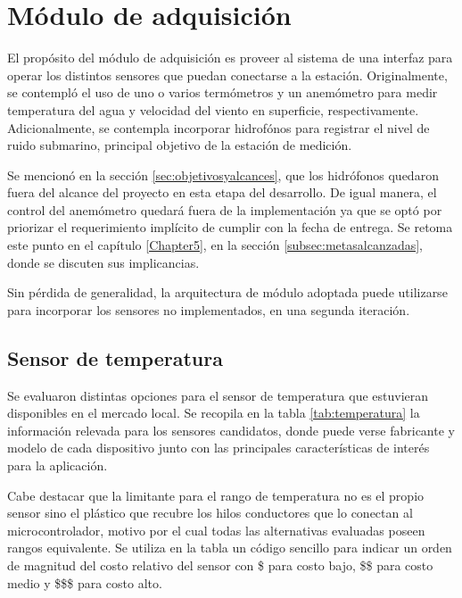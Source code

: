 \clearpage
\section{Módulo de adquisición}
\label{sec:adquisicion}

El propósito del módulo de adquisición es proveer al sistema de una interfaz para operar los distintos sensores que puedan conectarse a la estación.  Originalmente, se contempló el uso de uno o varios termómetros y un anemómetro para medir temperatura del agua y velocidad del viento en superficie, respectivamente. Adicionalmente, se contempla incorporar hidrofónos para registrar el nivel de ruido submarino, principal objetivo de la estación de medición.

Se mencionó en la sección \ref{sec:objetivosyalcances}, que los hidrófonos quedaron fuera del alcance del proyecto en esta etapa del desarrollo.  De igual manera, el control del anemómetro quedará fuera de la implementación ya que se optó por priorizar el requerimiento implícito de cumplir con la fecha de entrega.  Se retoma este punto en el capítulo \ref{Chapter5}, en la sección \ref{subsec:metasalcanzadas}, donde se discuten sus implicancias.

Sin pérdida de generalidad, la arquitectura de módulo adoptada puede utilizarse para incorporar los sensores no implementados, en una segunda iteración.

\subsection{Sensor de temperatura}
\label{subsec:1-wire}


Se evaluaron distintas opciones para el sensor de temperatura que estuvieran disponibles en el mercado local.  Se recopila en la tabla \ref{tab:temperatura} la información relevada para los sensores candidatos, donde puede verse fabricante y modelo de cada dispositivo junto con las principales características de interés para la aplicación.

Cabe destacar que la limitante para el rango de temperatura no es el propio sensor sino el plástico que recubre los hilos conductores que lo conectan al microcontrolador, motivo por el cual todas las alternativas evaluadas poseen rangos equivalente.  Se utiliza en la tabla un código sencillo para indicar un orden de magnitud del costo relativo del sensor con \$ para costo bajo, \$\$ para costo medio y \$\$\$ para costo alto.

